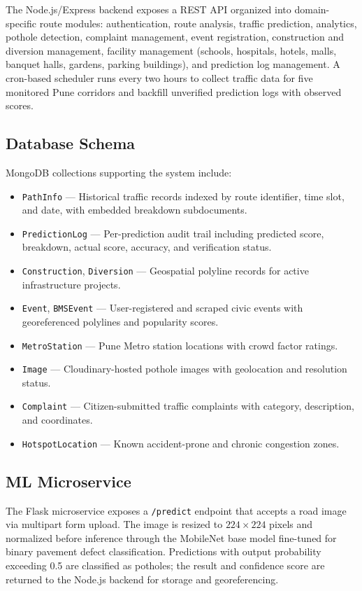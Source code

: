 \documentclass[conference]{IEEEtran}
\begin{document}
The Node.js/Express backend exposes a REST API organized into domain-specific route modules: authentication, route analysis, traffic prediction, analytics, pothole detection, complaint management, event registration, construction and diversion management, facility management (schools, hospitals, hotels, malls, banquet halls, gardens, parking buildings), and prediction log management. A cron-based scheduler runs every two hours to collect traffic data for five monitored Pune corridors and backfill unverified prediction logs with observed scores.

\subsection{Database Schema}

MongoDB collections supporting the system include:
\begin{itemize}
    \item \texttt{PathInfo} — Historical traffic records indexed by route identifier, time slot, and date, with embedded breakdown subdocuments.
    \item \texttt{PredictionLog} — Per-prediction audit trail including predicted score, breakdown, actual score, accuracy, and verification status.
    \item \texttt{Construction}, \texttt{Diversion} — Geospatial polyline records for active infrastructure projects.
    \item \texttt{Event}, \texttt{BMSEvent} — User-registered and scraped civic events with georeferenced polylines and popularity scores.
    \item \texttt{MetroStation} — Pune Metro station locations with crowd factor ratings.
    \item \texttt{Image} — Cloudinary-hosted pothole images with geolocation and resolution status.
    \item \texttt{Complaint} — Citizen-submitted traffic complaints with category, description, and coordinates.
    \item \texttt{HotspotLocation} — Known accident-prone and chronic congestion zones.
\end{itemize}

\subsection{ML Microservice}

The Flask microservice exposes a \texttt{/predict} endpoint that accepts a road image via multipart form upload. The image is resized to $224 \times 224$ pixels and normalized before inference through the MobileNet base model fine-tuned for binary pavement defect classification. Predictions with output probability exceeding 0.5 are classified as potholes; the result and confidence score are returned to the Node.js backend for storage and georeferencing.
\end{document}
